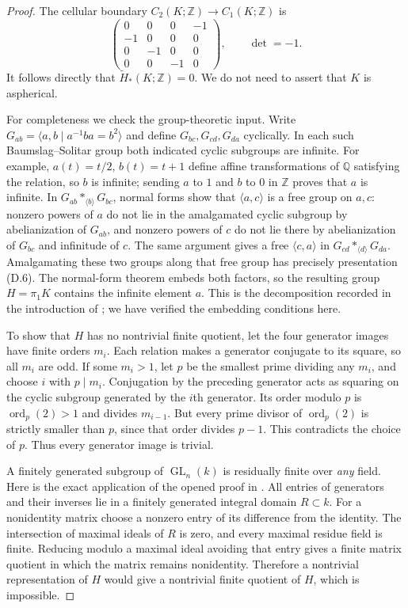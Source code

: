 \begin{proof}
The cellular boundary $C_2(K;\mathbb Z)\to C_1(K;\mathbb Z)$ is
\[
 \begin{pmatrix}
 0&0&0&-1\\ -1&0&0&0\\0&-1&0&0\\0&0&-1&0
 \end{pmatrix},
 \qquad\det=-1.
 \tag{D.7}
\]
It follows directly that $\widetilde H_*(K;\mathbb Z)=0$.
We do not need to assert that $K$ is aspherical.

For completeness we check the group-theoretic input. Write
$G_{ab}=\langle a,b\mid a^{-1}ba=b^2\rangle$ and define
$G_{bc},G_{cd},G_{da}$ cyclically. In each such Baumslag--Solitar
group both indicated cyclic subgroups are infinite. For example,
$a(t)=t/2$, $b(t)=t+1$ define affine transformations of $\mathbb Q$
satisfying the relation, so $b$ is infinite; sending $a$ to $1$ and
$b$ to $0$ in $\mathbb Z$ proves that $a$ is infinite.
In $G_{ab}*_{\langle b\rangle}G_{bc}$, normal forms show that
$\langle a,c\rangle$ is a free group on $a,c$: nonzero powers of $a$
do not lie in the amalgamated cyclic subgroup by abelianization of
$G_{ab}$, and nonzero powers of $c$ do not lie there by abelianization
of $G_{bc}$ and infinitude of $c$. The same argument gives a free
$\langle c,a\rangle$ in $G_{cd}*_{\langle d\rangle}G_{da}$.
Amalgamating these two groups along that free group has precisely
presentation (D.6). The normal-form theorem embeds both factors,
so the resulting group $H=\pi_1K$ contains the infinite element $a$.
This is the decomposition recorded in the introduction of
\citet{D_Baker2019}; we have verified the embedding conditions here.

To show that $H$ has no nontrivial finite quotient, let the four
generator images have finite orders $m_i$. Each relation makes a
generator conjugate to its square, so all $m_i$ are odd. If some
$m_i>1$, let $p$ be the smallest prime dividing any $m_i$, and choose
$i$ with $p\mid m_i$. Conjugation by the preceding generator acts
as squaring on the cyclic subgroup generated by the $i$th generator.
Its order modulo $p$ is $\operatorname{ord}_p(2)>1$ and divides
$m_{i-1}$. But every prime divisor of $\operatorname{ord}_p(2)$ is
strictly smaller than $p$, since that order divides $p-1$. This
contradicts the choice of $p$. Thus every generator image is trivial.

A finitely generated subgroup of $\operatorname{GL}_n(k)$ is
residually finite over \emph{any} field. Here is the exact application
of the opened proof in \citet[Lemma 3.2(iii),(iv), and the proof of
Theorem 3.1]{D_Nica2013}. All entries of generators and their inverses
lie in a finitely generated integral domain $R\subset k$. For a
nonidentity matrix choose a nonzero entry of its difference from the
identity. The intersection of maximal ideals of $R$ is zero, and
every maximal residue field is finite. Reducing modulo a maximal
ideal avoiding that entry gives a finite matrix quotient in which
the matrix remains nonidentity. Therefore a nontrivial representation
of $H$ would give a nontrivial finite quotient of $H$, which is
impossible.


\end{proof}
